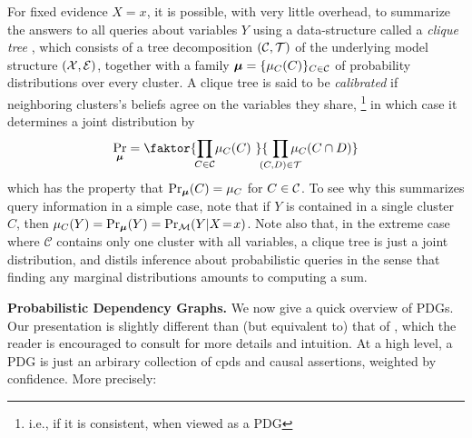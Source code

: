 \documentclass[twoside]{article}
\begin{document}
For fixed evidence
$X \!=\! x$, it is possible, with very 
little overhead, to summarize the answers to all queries about variables
$Y$ using a data-structure called a \emph{clique tree} 
\parencite[\S10]{koller2009probabilistic}, which consists of 
a tree decomposition $(\cal C, T)$
of the underlying model structure $(\cal X, E)$, together with a family $\boldsymbol\mu = \{\mu_C(C)\}_{ C \in \mathcal C}$ of probability distributions over every cluster. 
A clique tree is said to be \emph{calibrated} if neighboring clusters's beliefs agree on the variables they share,%
    \footnote{i.e., if it is consistent, when viewed as a PDG}
in which case it determines a joint distribution by
\begin{equation}
    \Pr_{\bmu} = \faktor
        {\prod_{\mathclap{C \in \cal C}} \mu_C(C)~}
        {~\prod_{\mathclap{(C,D) \in \cal T}} \mu_{C}(C \cap D)}
    \label{eq:cliquedist}
\end{equation}
which has the property that $\Pr_{\boldsymbol\mu}(C) = \mu_C$ for $C \in \cal C$. 
To see why this summarizes query information in a simple case, note that if $Y$ is contained in a single cluster $C$, then $\mu_C(Y) = \Pr_{\boldsymbol\mu}(Y) = \Pr_{\cal M}(Y | X \!=\! x)$.
Note also that, in the extreme case where $\mathcal C$ contains only one cluster with all variables, a clique tree is just a joint distribution, and distils inference about probabilistic queries in the sense that finding any marginal distributions amounts to computing a sum. 

\textbf{Probabilistic Dependency Graphs.}
We now give a quick overview of PDGs. Our presentation is slightly
different than (but equivalent to) that of 
\textcite{pdg-aaai}, which 
the reader is encouraged to consult for more details and intuition.
At a high level, a PDG
is just an arbirary collection of cpds and causal assertions,
    weighted by confidence. More precisely:
\end{document}
